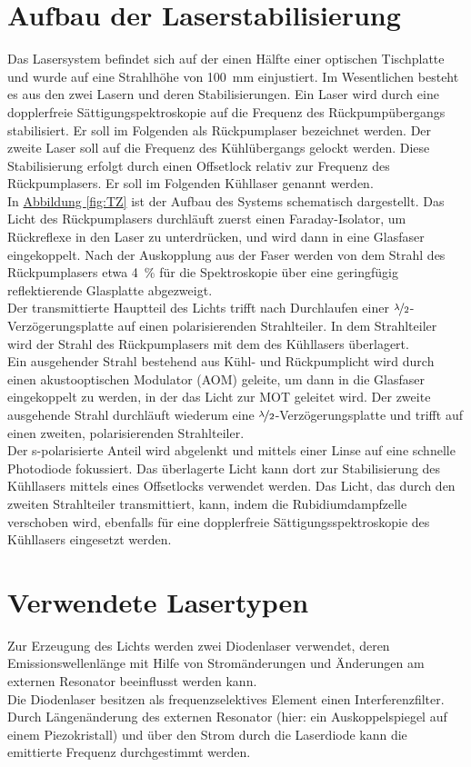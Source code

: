 \documentclass[
class=book,
accentcolor=1b,
custommargins=geometry,
fontsize=11pt,
thesis={type=Versuchsanleitung},
ruledheaders=all,
headline=false,
instbox=false,
marginpar=false,
title=small,
ignore-missing-data=true,
twoside=false,
logofile=apqdesign/tuda_logo.pdf,
pdfa=false %
]{apqpub}
\begin{document}
			\section{Aufbau der Laserstabilisierung}	
			Das Lasersystem befindet sich auf der einen Hälfte einer optischen Tischplatte und wurde auf eine Strahlhöhe von \qty{100}{\milli\metre} einjustiert. 
			Im Wesentlichen besteht es aus den zwei Lasern und deren Stabilisierungen. 
			Ein Laser wird durch eine dopplerfreie Sättigungspektroskopie auf die Frequenz des Rückpumpübergangs stabilisiert. 
			Er soll im Folgenden als Rückpumplaser bezeichnet werden. Der zweite Laser soll auf die Frequenz des Kühlübergangs gelockt werden. 
			Diese Stabilisierung erfolgt durch einen Offsetlock relativ zur Frequenz des Rückpumplasers. Er soll im Folgenden Kühllaser genannt werden.\\
			In \hyperref[fig:TZ]{Abbildung \ref{fig:TZ}} ist der Aufbau des Systems schematisch dargestellt. 
			Das Licht des Rückpumplasers durchläuft zuerst einen Faraday-Isolator, um Rückreflexe in den Laser zu unterdrücken, und wird dann in eine Glasfaser eingekoppelt. 
			Nach der Auskopplung aus der Faser werden von dem Strahl des Rückpumplasers etwa \qty{4}{\percent} für die Spektroskopie über eine geringfügig reflektierende Glasplatte abgezweigt.\\
			Der transmittierte Hauptteil des Lichts trifft nach Durchlaufen einer $\nicefrac{\lambda}{2}$-Verzögerungsplatte auf einen polarisierenden Strahlteiler. 
			In dem Strahlteiler wird der Strahl des Rückpumplasers mit dem des Kühllasers überlagert.\\
			Ein ausgehender Strahl bestehend aus Kühl- und Rückpumplicht wird durch einen akustooptischen Modulator (AOM) geleite, um dann in die Glasfaser eingekoppelt zu werden, in der das Licht zur MOT geleitet wird.
			Der zweite ausgehende Strahl durchläuft wiederum eine $\nicefrac{\lambda}{2}$-Verzögerungsplatte und trifft auf einen zweiten, polarisierenden Strahlteiler.\\
			Der s-polarisierte Anteil wird abgelenkt und mittels einer Linse auf eine schnelle Photodiode fokussiert. 
			Das überlagerte Licht kann dort zur Stabilisierung des Kühllasers mittels eines Offsetlocks verwendet werden.
			Das Licht, das durch den zweiten Strahlteiler transmittiert, kann, indem die Rubidiumdampfzelle verschoben wird, ebenfalls für eine dopplerfreie Sättigungsspektroskopie des Kühllasers eingesetzt werden.
			
			\section{Verwendete Lasertypen}			
			Zur Erzeugung des Lichts werden zwei Diodenlaser verwendet, deren Emissionswellenlänge mit Hilfe von Stromänderungen und Änderungen am externen Resonator beeinflusst werden kann.\\
			Die Diodenlaser besitzen als frequenzselektives Element einen Interferenzfilter. 
			Durch Längenänderung des externen Resonator (hier: ein Auskoppelspiegel auf einem Piezokristall) und über den Strom durch die Laserdiode kann die emittierte Frequenz durchgestimmt werden.\\
			
\end{document}
